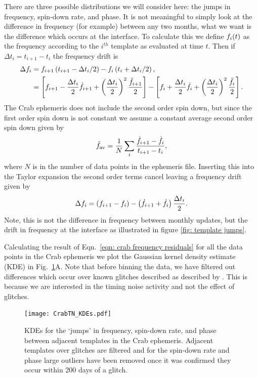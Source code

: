 \documentclass[../full_thesis/full_thesis.tex]{subfiles}
\begin{document}
There are three possible distributions we will consider here: the jumps in
frequency, spin-down rate, and phase. It is not meaningful to simply look at
the difference in frequency (for example) between any two months, what we want
is the difference which occurs at the interface. To calculate this
we define $f_{i}(t)$ as the frequency according to the
$i^{th}$ template as evaluated at time $t$. Then if $\Delta t_{i} = t_{i+1} -
t_{i}$ the frequency drift is
\begin{align}
\Delta f_{i} &= f_{i+1}\left(t_{i+1}-\Delta t_{i}/2\right) -  f_{i}\left(t_{i}+\Delta t_{i}/2\right), \\
    &= \left[f_{i+1}- \frac{\Delta t_{i}}{2}\dot{f}_{i+1} + \left(\frac{\Delta t_{i}}{2}\right)^{2}\frac{\ddot{f}_{i+1}}{2}\right]
     - \left[f_{i} + \frac{\Delta t_{i}}{2}\dot{f}_{i}+ \left(\frac{\Delta t_{i}}{2}\right)^{2}\frac{\ddot{f}_{i}}{2}\right] .
\end{align}
The Crab ephemeris does not include the second order spin down, but since the
first order spin down is not constant we assume a constant average second order
spin down given by
\newcommand{\fddotav}{\ddot{\f}_{\textrm{av}}}
\begin{equation}
   \fddotav = \frac{1}{N}\sum_{i} \frac{\dot{\f}_{i+1} - \dot{\f_{i}}}{t_{i+1} - t_{i}},
   \label{eqn: average second order spin down}
\end{equation}
where $N$ is in the number of data points in the ephemeris file. Inserting this
into the Taylor expansion the second order terms cancel leaving a frequency
drift given by
\begin{equation}
\Delta f_{i} = \left(f_{i+1}- f_{i}\right) -  \left(\dot{f}_{i+1}
               + \dot{f}_{i}\right)\frac{\Delta t_{i}}{2}.
\label{eqn: crab frequency residuals}
\end{equation}
Note, this is not the difference in frequency between monthly
updates, but the drift in frequency at the interface as illustrated in figure
\ref{fig: template jumps}.

Calculating the result of Eqn.~\eqref{eqn: crab frequency residuals} for all
the data points in the Crab ephemeris we plot the Gaussian kernel density
estimate (KDE) in Fig.~\ref{fig: crab kde}A.  Note that before binning the
data, we have filtered out differences which occur over known glitches
described as described by \citet{Espinoza2011}. This is because we are
interested in the timing noise activity and not the effect of glitches.
\begin{figure}[ht]
\centering
\texttt{[image: CrabTN\_KDEs.pdf]}
\caption{KDEs for the `jumps' in frequency, spin-down rate, and phase between
         adjacent templates in the Crab ephemeris. Adjacent templates over
         glitches are filtered and for the spin-down rate and
         phase large outliers have been removed once it was confirmed they
         occur within 200 days of a glitch.}
\label{fig: crab kde}
\end{figure}
\end{document}

